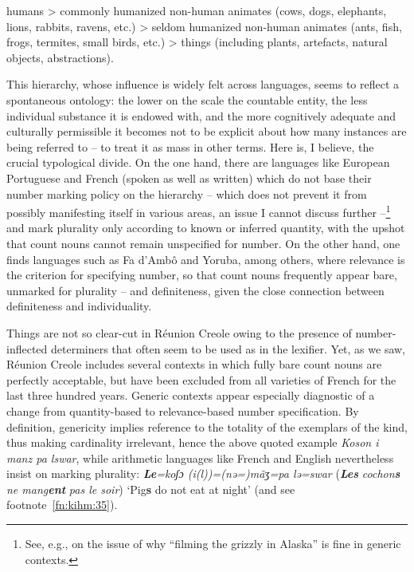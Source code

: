 \documentclass[output=paper]{langscibook}
\begin{document}
\ea humans > commonly humanized non-human animates (cows, dogs, elephants, lions, rabbits, ravens, etc.) > seldom humanized non-human animates (ants, fish, frogs, termites, small birds, etc.) > things (including plants, artefacts, natural objects, abstractions).
\z

This hierarchy, whose influence is widely felt across languages, seems to reflect a spontaneous ontology: the lower on the scale the countable entity, the less individual substance it is endowed with, and the more cognitively adequate and culturally permissible it becomes not to be explicit about how many instances are being referred to -- to treat it as mass in other terms. Here is, I believe, the crucial typological divide. On the one hand, there are languages like European Portuguese and French (spoken as well as written) which do not base their number marking policy on the hierarchy -- which does not prevent it from possibly manifesting itself in various areas, an issue I cannot discuss further --\footnote{See, e.g., \citet{KrifkaEtAl1995} on the issue of why “filming the grizzly in Alaska” is fine in generic contexts.} and mark plurality only according to known or inferred quantity, with the upshot that count nouns cannot remain unspecified for number. On the other hand, one finds languages such as Fa d’Ambô and Yoruba, among others, where relevance is the criterion for specifying number, so that count nouns frequently appear bare, unmarked for plurality -- and definiteness, given the close connection between definiteness and individuality.

Things are not so clear-cut in Réunion Creole owing to the presence of number-inflected determiners that often seem to be used as in the lexifier. Yet, as we saw, Réunion Creole includes several contexts in which fully bare count nouns are perfectly acceptable, but have been excluded from all varieties of French for the last three hundred years. Generic contexts appear especially diagnostic of a change from quantity-based to relevance-based number specification. By definition, genericity implies reference to the totality of the exemplars of the kind, thus making cardinality irrelevant, hence the above quoted example \textit{Koson i manz pa lswar}, while arithmetic languages like French and English nevertheless insist on marking plurality: \textbf{\textit{Le}}\textit{=koʃɔ (i(l))=(nə=)mãʒ=pa lə=swar} (\textbf{\textit{Les}} \textit{cochon}\textbf{\textit{s}} \textit{ne mang}\textbf{\textit{ent}} \textit{pas le soir}) ‘Pig\textbf{s} do not eat at night’ (and see footnote~\ref{fn:kihm:35}).
\end{document}
